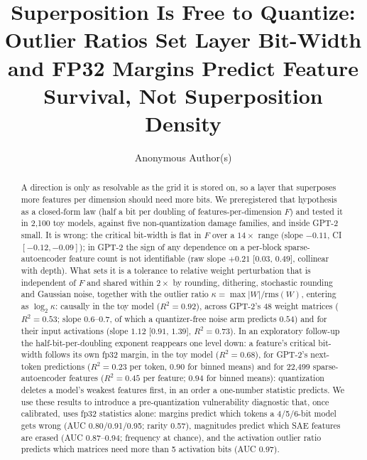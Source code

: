 \documentclass{article}
\title{Superposition Is Free to Quantize: Outlier Ratios Set Layer Bit-Width and FP32 Margins Predict Feature Survival, Not Superposition Density}
\author{Anonymous Author(s)}
\begin{document}
\nolinenumbers
\maketitle

\begin{abstract}
A direction is only as resolvable as the grid it is stored on, so a layer that superposes more features per dimension
should need more bits. We preregistered
that hypothesis as a closed-form law (half a bit per doubling of features-per-dimension $F$) and tested it in 2{,}100
toy models, against five non-quantization damage families, and inside GPT-2 small. It is wrong:
the critical bit-width is flat in $F$ over a $14\times$ range (slope $-0.11$, CI $[-0.12,-0.09]$); in GPT-2 the sign of any dependence on a per-block sparse-autoencoder feature count is not identifiable (raw slope
$+0.21$ [$0.03$, $0.49$], collinear with depth). What sets it is a
tolerance to relative weight perturbation that is independent of $F$ and shared within $2\times$ by rounding, dithering,
stochastic rounding and Gaussian noise, together with the outlier ratio $\kappa=\max|W|/\mathrm{rms}(W)$, entering as
$\log_2\kappa$: causally in the toy model ($R^2=0.92$), across GPT-2's 48 weight matrices ($R^2=0.53$; slope $0.6$--$0.7$, of
which a quantizer-free noise arm predicts $0.54$) and for their input activations (slope $1.12$ [$0.91$, $1.39$], $R^2=0.73$). In an exploratory follow-up the half-bit-per-doubling exponent reappears one level down: a feature's critical
bit-width follows its own fp32 margin, in the toy model ($R^2=0.68$), for GPT-2's next-token predictions ($R^2=0.23$ per token, $0.90$ for binned means) and for 22{,}499 sparse-autoencoder features ($R^2=0.45$ per feature;
$0.94$ for binned means):
quantization deletes a model's weakest features first, in an order a one-number statistic predicts. We use these results to introduce a pre-quantization vulnerability diagnostic that,
once calibrated, uses fp32 statistics alone: margins predict which tokens a 4/5/6-bit model gets wrong (AUC 0.80/0.91/0.95; rarity 0.57), magnitudes predict which
SAE features are erased (AUC 0.87--0.94; frequency at chance), and the activation outlier ratio predicts which matrices need more
than 5 activation bits (AUC 0.97).
\end{abstract}
\end{document}
